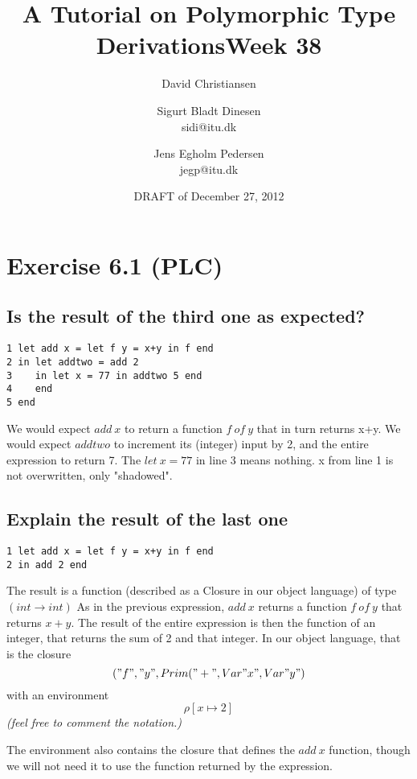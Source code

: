 \documentclass[a4paper]{article}
\title{A Tutorial on Polymorphic Type Derivations}
\author{David Christiansen}
\date{DRAFT of December 27, 2012}
\begin{document}
\title{Week 38}
\author{Sigurt Bladt Dinesen \\sidi{@}itu.dk \and Jens Egholm Pedersen \\jegp{@}itu.dk}
\maketitle
\section*{Exercise 6.1 (PLC)}
\subsection*{Is the result of the third one as expected?}
\begin{verbatim}
1 let add x = let f y = x+y in f end
2 in let addtwo = add 2
3    in let x = 77 in addtwo 5 end
4    end
5 end
\end{verbatim}
We would expect $add\ x$ to return a function $f\ of\ y$ that in turn returns x+y.
We would expect $addtwo$ to increment its (integer) input by 2, and the entire expression
to return 7.
The $let\ x = 77$ in line 3 means nothing. x from line 1 is not overwritten, only "shadowed".

\subsection*{Explain the result of the last one}
\begin{verbatim}
1 let add x = let f y = x+y in f end
2 in add 2 end
\end{verbatim}
The result is a function (described as a Closure in our object language) of
type $(int \to int)$ As in the previous expression, $add\ x$ returns a function
$f\ of\ y$ that returns $x+y$. The result of the entire expression is then the
function of an integer, that returns the sum of 2 and that integer.
In our object language, that is the closure
$$("f","y", Prim("+", Var "x", Var "y")$$
with an environment $$\rho [x \mapsto 2]$$
\textit{\small{(feel free to comment the notation.)}}

The environment also contains the closure that defines the $add\ x$ function,
though we will not need it to use the function returned by the expression.
\end{document}
